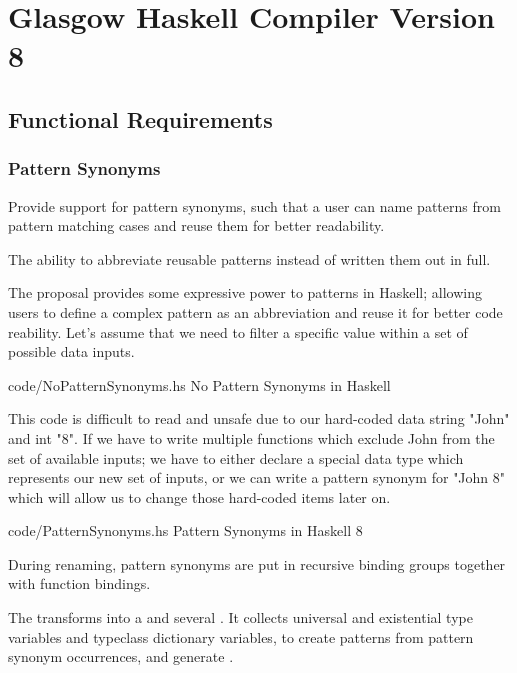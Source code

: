 \section{Glasgow Haskell Compiler Version 8}
\subsection{Functional Requirements}
\subsubsection{Pattern Synonyms}

\begin{requirement}
Provide support for pattern synonyms, such that a user can name patterns from pattern matching cases and reuse them for better readability.  \cite{wiki}
\end{requirement}

\begin{wanted}
The ability to abbreviate reusable patterns instead of written them out in full.
\end{wanted}

\begin{explication}
The proposal provides some expressive power to patterns in Haskell; allowing users to define a complex pattern as an abbreviation and reuse it for better code reability. Let's assume that we need to
filter a specific value within a set of possible data inputs.
\end{explication}

    {code/NoPatternSynonyms.hs}
    {No Pattern Synonyms in Haskell}
\label{fig::no::pattern::synonyms}

This code is difficult to read and unsafe due to our hard-coded data string "John" and int "8". If we have to write multiple functions which exclude John from the set of available inputs; we have to either declare a special data type which represents our new set of inputs, or we can write a pattern synonym for "John 8" which will allow us to change those hard-coded items later on. \cite{wiki}

    {code/PatternSynonyms.hs}
    {Pattern Synonyms in Haskell 8}
\label{fig::pattern::synonyms}

During renaming, pattern synonyms are put in recursive binding groups together with function bindings. \cite{wiki}

The  transforms  into a  and several . It collects universal and existential type variables and typeclass dictionary variables, to create  patterns from pattern synonym occurrences, and generate . \cite{wiki}

